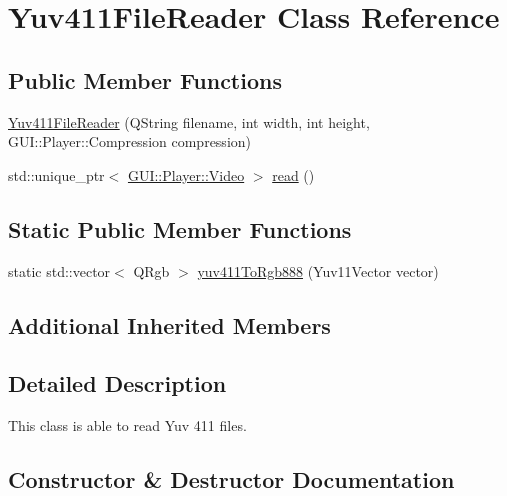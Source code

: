 \hypertarget{classGUI_1_1Player_1_1Yuv411FileReader}{}\section{Yuv411\+File\+Reader Class Reference}
\label{classGUI_1_1Player_1_1Yuv411FileReader}
\subsection*{Public Member Functions}
\begin{DoxyCompactItemize}
\item 
\hyperlink{classGUI_1_1Player_1_1Yuv411FileReader_adf9dd9c35dc22d92d81620a52f560737}{Yuv411\+File\+Reader} (Q\+String filename, int width, int height, G\+U\+I\+::\+Player\+::\+Compression compression)
\item 
std\+::unique\+\_\+ptr$<$ \hyperlink{classGUI_1_1Player_1_1Video}{G\+U\+I\+::\+Player\+::\+Video} $>$ \hyperlink{classGUI_1_1Player_1_1Yuv411FileReader_a796f80ad40ecc8941c49cd734ddeeae9}{read} ()
\end{DoxyCompactItemize}
\subsection*{Static Public Member Functions}
\begin{DoxyCompactItemize}
\item 
static std\+::vector$<$ Q\+Rgb $>$ \hyperlink{classGUI_1_1Player_1_1Yuv411FileReader_af6d2712d6e14bd1bb6cd0b7658ad71fb}{yuv411\+To\+Rgb888} (Yuv11\+Vector vector)
\end{DoxyCompactItemize}
\subsection*{Additional Inherited Members}


\subsection{Detailed Description}
This class is able to read Yuv 411 files. 

\subsection{Constructor \& Destructor Documentation}
\hypertarget{classGUI_1_1Player_1_1Yuv411FileReader_adf9dd9c35dc22d92d81620a52f560737}{}
